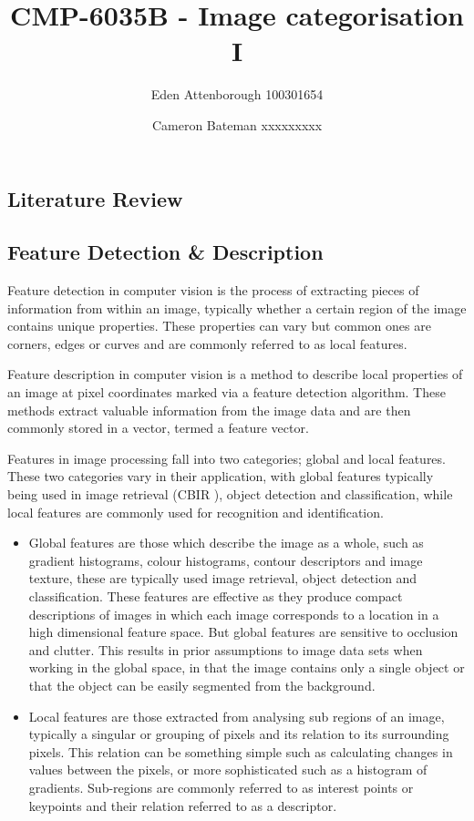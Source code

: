 \documentclass{article}
\author{Eden Attenborough 100301654 \and Cameron Bateman xxxxxxxxx}
\title{CMP-6035B - Image categorisation I}
\begin{document}
\begin{multicols}{2}

\maketitle
\section{Literature Review}

\subsection{Feature Detection \& Description}
Feature detection in computer vision is the process of extracting pieces of information from within an image, typically whether a certain region of the image contains unique properties. These properties can vary but common ones are corners, edges or curves and are commonly referred to as local features.

Feature description in computer vision is a method to describe local properties of an image at pixel coordinates marked via a feature detection algorithm. These methods extract valuable information from the image data and are then commonly stored in a vector, termed a feature vector. 

Features in image processing fall into two categories; global and local features. These two categories vary in their application, with global features typically being used in image retrieval (CBIR \cite{image-retrieval-global-features}), object detection and classification, while local features are commonly used for recognition and identification.

\begin{itemize}
	\item Global features are those which describe the image as a whole, such as gradient histograms, colour histograms, contour descriptors and image texture, these are typically used image retrieval, object detection and classification. These features are effective as they produce compact descriptions of images in which each image corresponds to a location in a high dimensional feature space. But global features are sensitive to occlusion and clutter. This results in prior assumptions to image data sets when working in the global space, in that the image contains only a single object or that the object can be easily segmented from the background. \cite{global-and-local-features}
	\item Local features are those extracted from analysing sub regions of an image, typically a singular or grouping of pixels and its relation to its surrounding pixels. This relation can be something simple such as calculating changes in values between the pixels, or more sophisticated such as a histogram of gradients. Sub-regions are commonly referred to as interest points or keypoints and their relation referred to as a descriptor.
\end{itemize}



\end{multicols}
\end{document}
